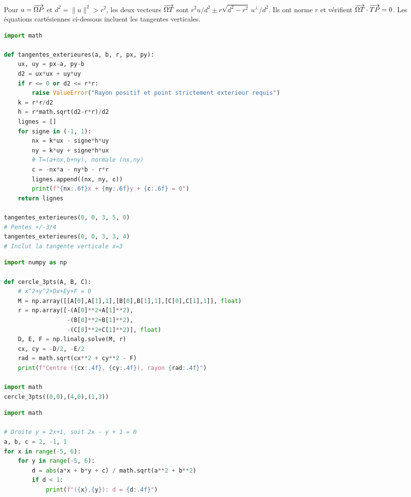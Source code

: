 Pour $u=\overrightarrow{\Omega P}$ et $d^2=\|u\|^2>r^2$, les deux vecteurs
$\overrightarrow{\Omega T}$ sont $r^2u/d^2\pm r\sqrt{d^2-r^2}\,u^\perp/d^2$.
Ils ont norme $r$ et v\'erifient $\overrightarrow{\Omega T}\cdot\overrightarrow{TP}=0$.
Les \'equations cart\'esiennes ci-dessous incluent les tangentes verticales.
\begin{lstlisting}[language=Python]
import math

def tangentes_exterieures(a, b, r, px, py):
    ux, uy = px-a, py-b
    d2 = ux*ux + uy*uy
    if r <= 0 or d2 <= r*r:
        raise ValueError("Rayon positif et point strictement exterieur requis")
    k = r*r/d2
    h = r*math.sqrt(d2-r*r)/d2
    lignes = []
    for signe in (-1, 1):
        nx = k*ux - signe*h*uy
        ny = k*uy + signe*h*ux
        # T=(a+nx,b+ny), normale (nx,ny)
        c = -nx*a - ny*b - r*r
        lignes.append((nx, ny, c))
        print(f"{nx:.6f}x + {ny:.6f}y + {c:.6f} = 0")
    return lignes

tangentes_exterieures(0, 0, 3, 5, 0)
# Pentes +/-3/4
tangentes_exterieures(0, 0, 3, 3, 4)
# Inclut la tangente verticale x=3
\end{lstlisting}


\begin{lstlisting}[language=Python]
import numpy as np

def cercle_3pts(A, B, C):
    # x^2+y^2+Dx+Ey+F = 0
    M = np.array([[A[0],A[1],1],[B[0],B[1],1],[C[0],C[1],1]], float)
    r = np.array([-(A[0]**2+A[1]**2),
                  -(B[0]**2+B[1]**2),
                  -(C[0]**2+C[1]**2)], float)
    D, E, F = np.linalg.solve(M, r)
    cx, cy = -D/2, -E/2
    rad = math.sqrt(cx**2 + cy**2 - F)
    print(f"Centre ({cx:.4f}, {cy:.4f}), rayon {rad:.4f}")

import math
cercle_3pts((0,0),(4,0),(1,3))
\end{lstlisting}


\begin{lstlisting}[language=Python]
import math

# Droite y = 2x+1, soit 2x - y + 1 = 0
a, b, c = 2, -1, 1
for x in range(-5, 6):
    for y in range(-5, 6):
        d = abs(a*x + b*y + c) / math.sqrt(a**2 + b**2)
        if d < 1:
            print(f"({x},{y}): d = {d:.4f}")
\end{lstlisting}

